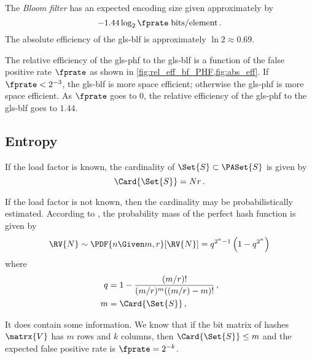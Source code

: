 \documentclass[ ../main.tex]{subfiles}
\begin{document}
The \emph{Bloom filter} has an expected encoding size given approximately by
\begin{equation}
    -1.44 \log_2 \fprate \; \si{bits \per element}\,.
\end{equation}
The absolute efficiency of the \gls{gls-blf} is approximately $\ln 2 \approx 0.69$.

The relative efficiency of the \gls{gls-phf} to the \gls{gls-blf} is a function of the false positive rate $\fprate$ as shown in \cref{fig:rel_eff_bf_PHF,fig:abs_eff}. If $\fprate < 2^{-3}$, the \gls{gls-blf} is more space efficient; otherwise the \gls{gls-phf} is more space efficient. As $\fprate$ goes to $0$, the relative efficiency of the \gls{gls-phf} to the \gls{gls-blf} goes to $1.44$. 

\subsection{Entropy}
If the load factor is known, the cardinality of $\Set{S} \subset \PASet{S}$ is given by
\begin{equation}
    \Card{\Set{S}} = N r\,.
\end{equation}

If the load factor is not known, then the cardinality may be probabilistically estimated.
According to \cite{}, the probability mass of the perfect hash function is given by
\begin{equation}
    \RV{N} \sim \PDF{n \Given m, r}[\RV{N}] = q^{2^n-1}\left(1 - q^{2^n}\right)
\end{equation}
where
\begin{equation}
\begin{split}
	q &= 1 - \frac{(m/r)!}{(m/r)^m ((m/r)-m)!}\,,\\
	m &= \Card{\Set{S}}\,,\\
\end{split}
\end{equation}


It does contain some information. We know that if the bit matrix of hashes $\matrx{V}$ has $m$ rows and $k$ columns, then $\Card{\Set{S}} \leq m$ and the expected false positive rate is $\fprate=2^{-k}$.
\end{document}
